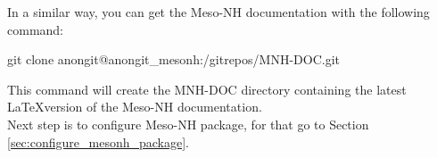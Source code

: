 In a similar way, you can get the Meso-NH documentation with the following command:
\begin{bashcode}
git clone anongit@anongit_mesonh:/gitrepos/MNH-DOC.git
\end{bashcode}

This command will create the MNH-DOC directory containing the latest \LaTeX version of the Meso-NH documentation. \\

Next step is to configure Meso-NH package, for that go to Section \ref{sec:configure_mesonh_package}.

 
